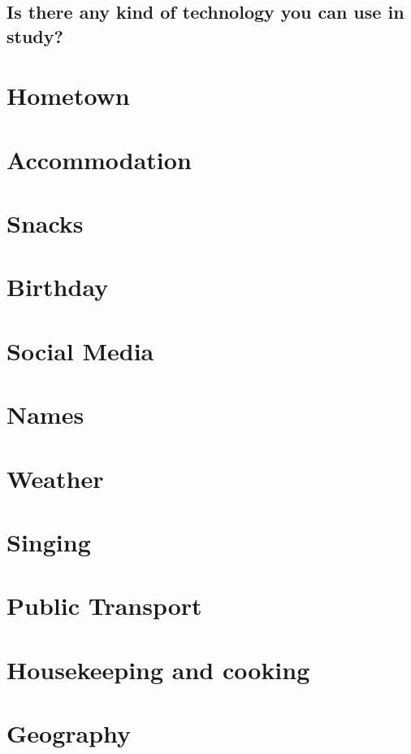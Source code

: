 \documentclass[conference]{IEEEtran}
\begin{document}
\subsection{Is there any kind of technology you can use in study?}


\section{Hometown}

\section{Accommodation}

\section{Snacks}

\section{Birthday}

\section{Social Media}

\section{Names}

\section{Weather}

\section{Singing}

\section{Public Transport}

\section{Housekeeping and cooking}

\section{Geography}
\end{document}
